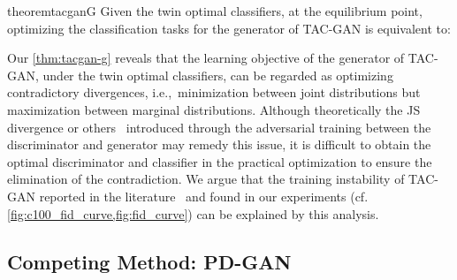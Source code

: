 \documentclass[nohyperref]{article}
\theoremstyle{plain}
\theoremstyle{definition}
\theoremstyle{remark}
\begin{document}
\begin{restatable}{theorem}{tacganG}\label{thm:tacgan-g}
Given the twin optimal classifiers, at the equilibrium point, optimizing the classification tasks for the generator of TAC-GAN is equivalent to:

\end{restatable}

Our \cref{thm:tacgan-g} reveals that the learning objective of the generator of TAC-GAN, under the twin optimal classifiers, can be regarded as optimizing contradictory divergences, i.e.,~minimization between joint distributions but maximization between marginal distributions.
Although theoretically the JS divergence or others~\cite{NIPS2016_cedebb6e,pmlr-v70-arjovsky17a} introduced through the adversarial training between the discriminator and generator may remedy this issue, it is difficult to obtain the optimal discriminator and classifier in the practical optimization to ensure the elimination of the contradiction.
We argue that the training instability of TAC-GAN reported in the literature~\cite{kocaoglu2018causalgan,han2020unbiased} and found in our experiments (cf. \cref{fig:c100_fid_curve,fig:fid_curve}) can be explained by this analysis.

\subsection{Competing Method: PD-GAN}\label{sec:pdgan}
\end{document}
